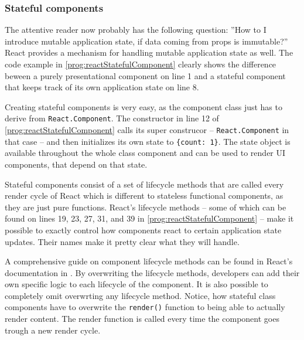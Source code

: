 \subsubsection{Stateful components}

The attentive reader now probably has the following question: ''How to I introduce mutable application state, if data coming from props is immutable?'' React provides a mechanism for handling mutable application state as well. The code example in \ref{prog:reactStatefulComponent} clearly shows the difference beween a purely presentational component on line 1 and a stateful component that keeps track of its own application state on line 8. 

Creating stateful components is very easy, as the component class just has to derive from \texttt{React.Component}. The constructor in line 12 of \ref{prog:reactStatefulComponent} calls its super construcor -- \texttt{React.Component} in that case -- and then initializes its own state to \texttt{\{count: 1\}}. The state object is available throughout the whole class component and can be used to render UI components, that depend on that state.

Stateful components consist of a set of lifecycle methods that are called every render cycle of React which is different to stateless functional components, as they are just pure functions. React's lifecycle methods -- some of which can be found on lines 19, 23, 27, 31, and 39 in \ref{prog:reactStatefulComponent} -- make it possible to exactly control how components react to certain application state updates. Their names make it pretty clear what they will handle. 

A comprehensive guide on component lifecycle methods can be found in React's documentation in \cite[/docs/react-component.html]{React}. By overwriting the lifecycle methods, developers can add their own specific logic to each lifecycle of the component. It is also possible to completely omit overwrting any lifecycle method. Notice, how stateful class components have to overwrite the \texttt{render()} function to being able to actually render content. The render function is called every time the component goes trough a new render cycle.

